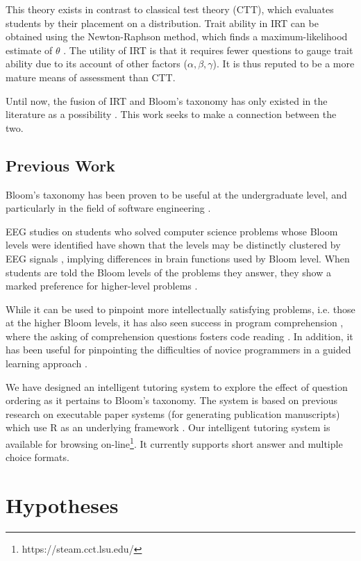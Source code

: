 \documentclass[a4paper,twocolumn]{article}
\begin{document}
This theory exists in contrast to classical test theory (CTT), which evaluates
students by their placement on a distribution.  Trait ability in IRT can be
obtained using the Newton-Raphson method, which finds a maximum-likelihood
estimate of $\theta$ \cite{baker2004}.  The utility of IRT is that it requires
fewer questions to gauge trait ability due to its account of other factors
($\alpha, \beta, \gamma$). It is thus reputed to be a more mature means of
assessment than CTT.

Until now, the fusion of IRT and Bloom's taxonomy has only existed in the
literature as a possibility \cite{sitthisak}.  This work seeks to make a
connection between the two.


\subsection{Previous Work}

Bloom's taxonomy has been proven to be useful at the undergraduate level, and
particularly in the field of software engineering \cite{britto2015}
\cite{mahmood2014}.

EEG studies on students who solved computer science problems whose Bloom levels
were identified have shown that the levels may be distinctly clustered by EEG
signals \cite{chatterjee2015}, implying differences in brain functions used by
Bloom level.  When students are told the Bloom levels of the problems they
answer, they show a marked preference for higher-level problems
\cite{bruyn2011} \cite{goel2004}.

While it can be used to pinpoint more intellectually satisfying problems, i.e.
those at the higher Bloom levels, it has also seen success in program
comprehension \cite{buckley2003}, where the asking of comprehension questions
fosters code reading \cite{losada2008}. In addition, it has been useful for
pinpointing the difficulties of novice programmers in a guided learning
approach \cite{shuhidan2011}.

We have designed an intelligent tutoring system to explore the effect of
question ordering as it pertains to Bloom's taxonomy.  The system is based on
previous research on executable paper systems (for generating publication
manuscripts) which use R as an underlying framework \cite{castleberry2011}.
Our intelligent tutoring system is available for browsing
on-line\footnote{https://steam.cct.lsu.edu/}. It currently supports short
answer and multiple choice formats.

\section{Hypotheses}
\end{document}
